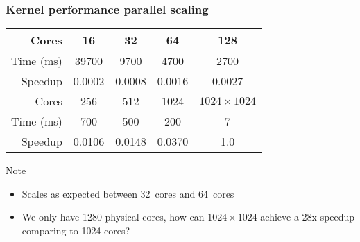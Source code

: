 \begin{frame}
  \frametitle{Kernel performance parallel scaling}
  \begin{table}[h]
    \begin{tabular}{rcccc}
      \toprule
      Cores & 16 & 32 & 64 & 128 \\
      \midrule
      Time (ms) & 39700 & 9700 & 4700 & 2700 \\
      Speedup & 0.0002 & 0.0008 & 0.0016 & 0.0027 \\
      \bottomrule
      \toprule
      Cores & 256 & 512 & 1024 & \(1024 \times 1024\)\\
      \midrule
      Time (ms) & 700 & 500 & 200 & 7 \\
      Speedup & 0.0106 & 0.0148 & 0.0370 & 1.0 \\
      \bottomrule
    \end{tabular}
  \end{table}
  \pause
  \begin{alertblock}{Note}
    \begin{itemize}
    \item Scales as expected between 32~cores and 64~cores
    \item We only have 1280 physical cores, how can
      \(1024 \times 1024\) achieve a 28x speedup comparing to 1024 cores?
    \end{itemize}
  \end{alertblock}
\end{frame}

